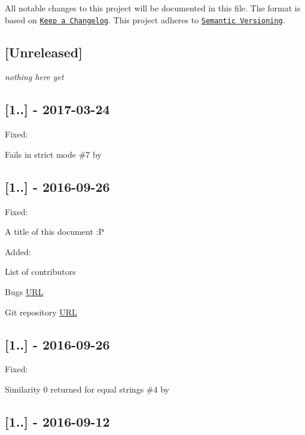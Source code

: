 All notable changes to this project will be documented in this file. The format is based on \href{http://keepachangelog.com/}{\tt Keep a Changelog}. This project adheres to \href{http://semver.org/}{\tt Semantic Versioning}.

\subsection*{\mbox{[}Unreleased\mbox{]}}

{\itshape nothing here yet}

\subsection*{\mbox{[}1..\mbox{]} -\/ 2017-\/03-\/24}

Fixed\+:
\begin{DoxyItemize}
\item Fails in strict mode \#7 by 
\end{DoxyItemize}

\subsection*{\mbox{[}1..\mbox{]} -\/ 2016-\/09-\/26}

Fixed\+:
\begin{DoxyItemize}
\item A title of this document \+:P
\end{DoxyItemize}

Added\+:
\begin{DoxyItemize}
\item List of contributors
\item Bugs \mbox{\hyperlink{namespace_u_r_l}{U\+RL}}
\item Git repository \mbox{\hyperlink{namespace_u_r_l}{U\+RL}}
\end{DoxyItemize}

\subsection*{\mbox{[}1..\mbox{]} -\/ 2016-\/09-\/26}

Fixed\+:
\begin{DoxyItemize}
\item Similarity 0 returned for equal strings \#4 by 
\end{DoxyItemize}

\subsection*{\mbox{[}1..\mbox{]} -\/ 2016-\/09-\/12}

